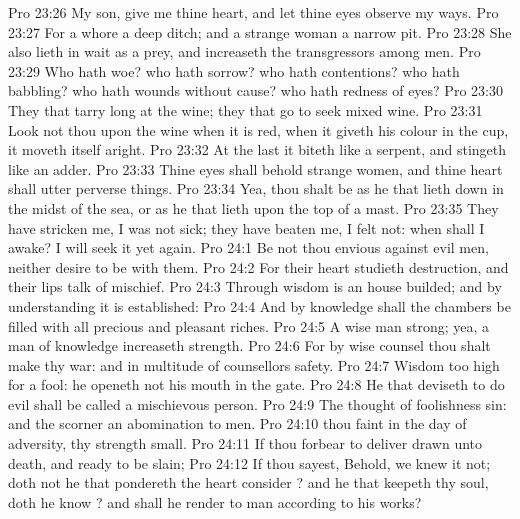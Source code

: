 \vs Pro 23:26 My son, give me thine heart, and let thine eyes observe my ways.
\vs Pro 23:27 For a whore  a deep ditch; and a strange woman  a narrow pit.
\vs Pro 23:28 She also lieth in wait as  a prey, and increaseth the transgressors among men.
\vs Pro 23:29 Who hath woe? who hath sorrow? who hath contentions? who hath babbling? who hath wounds without cause? who hath redness of eyes?
\vs Pro 23:30 They that tarry long at the wine; they that go to seek mixed wine.
\vs Pro 23:31 Look not thou upon the wine when it is red, when it giveth his colour in the cup,  it moveth itself aright.
\vs Pro 23:32 At the last it biteth like a serpent, and stingeth like an adder.
\vs Pro 23:33 Thine eyes shall behold strange women, and thine heart shall utter perverse things.
\vs Pro 23:34 Yea, thou shalt be as he that lieth down in the midst of the sea, or as he that lieth upon the top of a mast.
\vs Pro 23:35 They have stricken me,  I was not sick; they have beaten me,  I felt  not: when shall I awake? I will seek it yet again.
\vs Pro 24:1 Be not thou envious against evil men, neither desire to be with them.
\vs Pro 24:2 For their heart studieth destruction, and their lips talk of mischief.
\vs Pro 24:3 Through wisdom is an house builded; and by understanding it is established:
\vs Pro 24:4 And by knowledge shall the chambers be filled with all precious and pleasant riches.
\vs Pro 24:5 A wise man  strong; yea, a man of knowledge increaseth strength.
\vs Pro 24:6 For by wise counsel thou shalt make thy war: and in multitude of counsellors  safety.
\vs Pro 24:7 Wisdom  too high for a fool: he openeth not his mouth in the gate.
\vs Pro 24:8 He that deviseth to do evil shall be called a mischievous person.
\vs Pro 24:9 The thought of foolishness  sin: and the scorner  an abomination to men.
\vs Pro 24:10  thou faint in the day of adversity, thy strength  small.
\vs Pro 24:11 If thou forbear to deliver  drawn unto death, and  ready to be slain;
\vs Pro 24:12 If thou sayest, Behold, we knew it not; doth not he that pondereth the heart consider ? and he that keepeth thy soul, doth  he know ? and shall  he render to  man according to his works?
